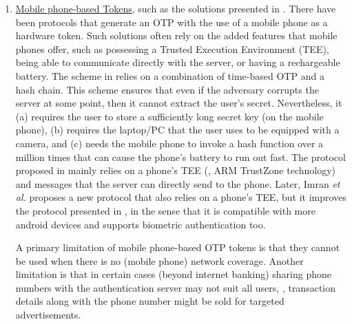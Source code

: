 \begin{enumerate}
%
\item \underline{Mobile phone-based Tokens}, such as the solutions presented in \cite{SARA22,KoganMB17,KonothFFARB20}. There have been protocols that generate an OTP with the use of a mobile phone as a hardware token. Such solutions often rely on the added features that mobile phones offer, such as possessing a Trusted Execution Environment (TEE), being able to communicate directly with the server, or having a rechargeable battery. The scheme in \cite{KoganMB17} relies on a combination of time-based OTP and a hash chain. This scheme ensures that even if the adversary corrupts the server at some point, then it cannot extract the user's secret. Nevertheless, it  (a) requires the user to store a sufficiently long secret key (on the mobile phone), (b) requires the laptop/PC that the user uses to be equipped with a camera, and (c) needs the mobile phone to invoke a hash function over a million times that can cause the phone's battery to run out fast. The protocol proposed in \cite{KonothFFARB20} mainly relies on a phone's TEE (\ie,  ARM TrustZone technology) and messages that the server can directly send to the phone. Later,  Imran \textit{et al.} \cite{SARA22} proposes a new protocol that also relies on a phone's TEE, but it improves the protocol presented in \cite{KonothFFARB20}, in the sense that it is compatible with more android devices and supports biometric authentication too. 

A primary limitation of mobile phone-based OTP tokens is that they cannot be used when there is no (mobile phone) network coverage. Another limitation is that in certain cases (beyond internet banking) sharing phone numbers with the authentication server may not suit all users, \eg, transaction details along with the phone number might be sold for targeted advertisements. 
%
\end{enumerate}




%








